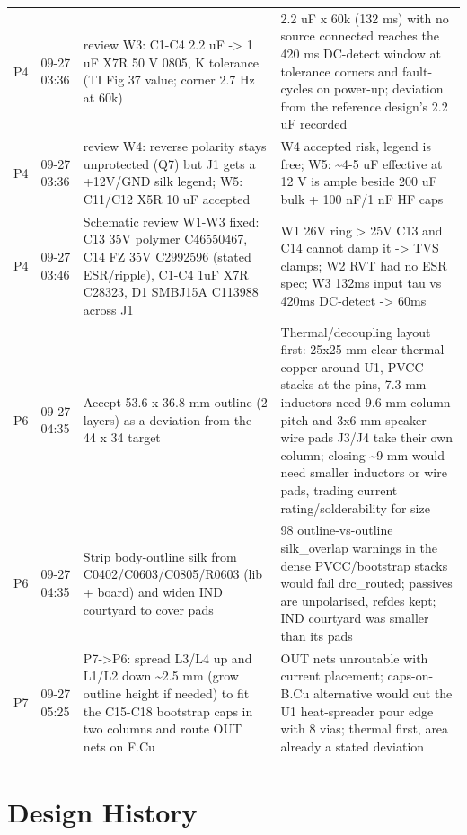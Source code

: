 \documentclass[11pt]{article}
\begin{document}
{\begin{longtable}{lp{1.6cm}p{6.2cm}p{6.2cm}}
P4 & 09-27 03:36 & review W3: C1-C4 2.2 uF -\textgreater{} 1 uF X7R 50 V 0805, K tolerance (TI Fig 37 value; corner 2.7 Hz at 60k) & 2.2 uF x 60k (132 ms) with no source connected reaches the 420 ms DC-detect window at tolerance corners and fault-cycles on power-up; deviation from the reference design's 2.2 uF recorded \\
P4 & 09-27 03:36 & review W4: reverse polarity stays unprotected (Q7) but J1 gets a +12V/GND silk legend; W5: C11/C12 X5R 10 uF accepted & W4 accepted risk, legend is free; W5: \textasciitilde{}4-5 uF effective at 12 V is ample beside 200 uF bulk + 100 nF/1 nF HF caps \\
P4 & 09-27 03:46 & Schematic review W1-W3 fixed: C13 35V polymer C46550467, C14 FZ 35V C2992596 (stated ESR/ripple), C1-C4 1uF X7R C28323, D1 SMBJ15A C113988 across J1 & W1 26V ring \textgreater{} 25V C13 and C14 cannot damp it -\textgreater{} TVS clamps; W2 RVT had no ESR spec; W3 132ms input tau vs 420ms DC-detect -\textgreater{} 60ms \\
P6 & 09-27 04:35 & Accept 53.6 x 36.8 mm outline (2 layers) as a deviation from the 44 x 34 target & Thermal/decoupling layout first: 25x25 mm clear thermal copper around U1, PVCC stacks at the pins, 7.3 mm inductors need 9.6 mm column pitch and 3x6 mm speaker wire pads J3/J4 take their own column; closing \textasciitilde{}9 mm would need smaller inductors or wire pads, trading current rating/solderability for size \\
P6 & 09-27 04:35 & Strip body-outline silk from C0402/C0603/C0805/R0603 (lib + board) and widen IND courtyard to cover pads & 98 outline-vs-outline silk\_overlap warnings in the dense PVCC/bootstrap stacks would fail drc\_routed; passives are unpolarised, refdes kept; IND courtyard was smaller than its pads \\
P7 & 09-27 05:25 & P7-\textgreater{}P6: spread L3/L4 up and L1/L2 down \textasciitilde{}2.5 mm (grow outline height if needed) to fit the C15-C18 bootstrap caps in two columns and route OUT nets on F.Cu & OUT nets unroutable with current placement; caps-on-B.Cu alternative would cut the U1 heat-spreader pour edge with 8 vias; thermal first, area already a stated deviation \\
\hline
\end{longtable}
}
\section{Design History}
\end{document}
